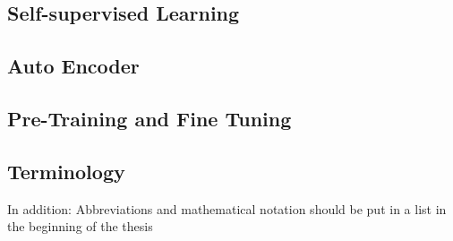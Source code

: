 \subsection{Self-supervised Learning}

\subsection{Auto Encoder} \label{subsec.autoencoder}

\subsection{Pre-Training and Fine Tuning}

\subsection{Terminology} \label{subsec.terminology}

In addition: Abbreviations and mathematical notation should be put in a list in the beginning of the thesis 

\newpage